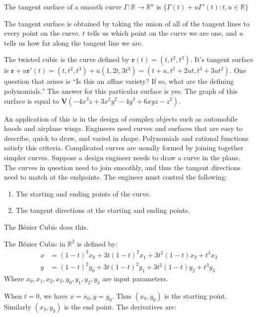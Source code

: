 \documentclass[crop=false,class=book,oneside]{standalone}
\begin{document}
\begin{definition}
The tangent surface of a smooth curve $\Gamma:\mathbb{R}\rightarrow \mathbb{R}^n$ is $\{\Gamma(t)+u\Gamma'(t):t,u\in \mathbb{R}\}$
\end{definition}
\begin{remark}
The tangent surface is obtained by taking the union of all of the tangent lines to every point on the curve. $t$ tells us which point on the curve we are one, and $u$ tells us how far along the tangent line we are.
\end{remark}
\begin{example}
The twisted cubic is the curve defined by $\mathbf{r}(t) = (t,t^2,t^3)$. It's tangent surface is $\mathbf{r}+u\mathbf{r}'(t)=(t,t^2,t^3)+u(1,2t,3t^3)=(t+u,t^2+2ut,t^3+3ut^2)$. One question that arises is ``Is this an affine variety? If so, what are the defining polynomials." The answer for this particular surface is yes. The graph of this surface is equal to $\mathbf{V}(-4x^3z+3x^2y^2-4y^3+6xyz-z^2)$.
\end{example}
An application of this is in the design of complex objects such as automobile hoods and airplane wings. Engineers need curves and surfaces that are easy to describe, quick to draw, and varied in shape. Polynomials and rational functions satisfy this criteria. Complicated curves are usually formed by joining together simpler curves. Suppose a design engineer needs to draw a curve in the plane. The curves in question need to join smoothly, and thus the tangent directions need to match at the endpoints. The engineer must control the following:
\begin{enumerate}
    \item The starting and ending points of the curve.
    \item The tangent directions at the starting and ending points.
\end{enumerate}
The B\'{e}zier Cubic does this.
\begin{definition}
The B\'{e}zier Cubic in $\mathbb{R}^2$ is defined by:
\begin{align*}
    x &= (1-t)^3 x_0+3t(1-t)^2x_1+3t^2(1-t)x_2+t^3x_3 \\
    y &= (1-t)^2 y_0+3t(1-t)^2y_1+3t^2(1-t)y_2+t^3y_3
\end{align*}
Where $x_0,x_1,x_2,x_3,y_0,y_1,y_2,y_3$ are input parameters.
\end{definition}
When $t=0$, we have $x = x_0, y=y_0$. Thus $(x_0,y_0)$ is the starting point. Similarly $(x_3,y_3)$ is the end point. The derivatives are:
\end{document}
